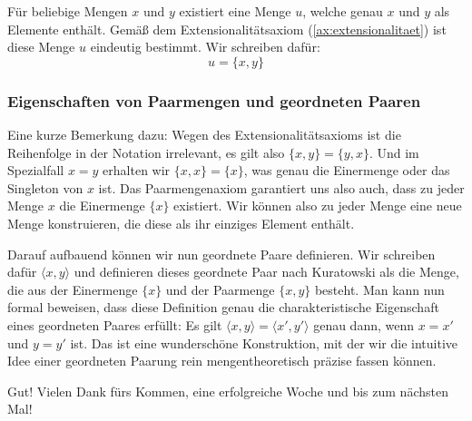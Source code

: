 \begin{math-stroke}
\begin{axiom}[Paarmengenaxiom]\label[axiom]{ax:paarmenge}
\[ \forall x \forall y \exists u \forall z \, (z \in u \leftrightarrow z = x \lor z = y) \]
\end{axiom}

\begin{explanation-of-steps}
Für beliebige Mengen $x$ und $y$ existiert eine Menge $u$, welche genau $x$ und $y$ als Elemente enthält. Gemäß dem Extensionalitätsaxiom (\ref{ax:extensionalitaet}) ist diese Menge $u$ eindeutig bestimmt. Wir schreiben dafür:
\[ u = \{x, y\} \]
\end{explanation-of-steps}
\end{math-stroke}

\subsubsection{Eigenschaften von Paarmengen und geordneten Paaren}
\begin{spoken-clean}[01:29:00 - 01:30:45]
Eine kurze Bemerkung dazu: Wegen des Extensionalitätsaxioms ist die Reihenfolge in der Notation irrelevant, es gilt also $\{x, y\} = \{y, x\}$. Und im Spezialfall $x = y$ erhalten wir $\{x, x\} = \{x\}$, was genau die Einermenge oder das Singleton von $x$ ist. Das Paarmengenaxiom garantiert uns also auch, dass zu jeder Menge $x$ die Einermenge $\{x\}$ existiert. Wir können also zu jeder Menge eine neue Menge konstruieren, die diese als ihr einziges Element enthält.

Darauf aufbauend können wir nun geordnete Paare definieren. Wir schreiben dafür $\langle x, y \rangle$ und definieren dieses geordnete Paar nach Kuratowski als die Menge, die aus der Einermenge $\{x\}$ und der Paarmenge $\{x, y\}$ besteht. Man kann nun formal beweisen, dass diese Definition genau die charakteristische Eigenschaft eines geordneten Paares erfüllt: Es gilt $\langle x, y \rangle = \langle x', y' \rangle$ genau dann, wenn $x = x'$ und $y = y'$ ist. Das ist eine wunderschöne Konstruktion, mit der wir die intuitive Idee einer geordneten Paarung rein mengentheoretisch präzise fassen können.

Gut! Vielen Dank fürs Kommen, eine erfolgreiche Woche und bis zum nächsten Mal!
\end{spoken-clean}

